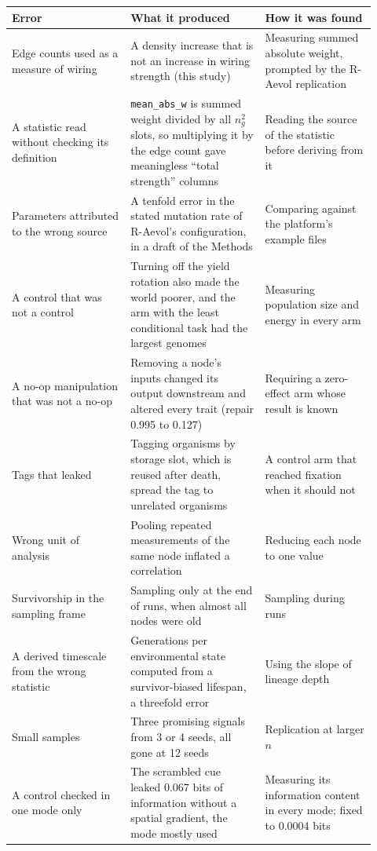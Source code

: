 \begin{longtable}{@{}p{0.3\linewidth}p{0.34\linewidth}p{0.28\linewidth}@{}}
\toprule
Error & What it produced & How it was found\\
\midrule
\endhead
Edge counts used as a measure of wiring & A density increase that is not an
increase in wiring strength (this study) & Measuring summed absolute weight,
prompted by the R-Aevol replication\\
A statistic read without checking its definition & \texttt{mean\_abs\_w} is summed
weight divided by all $n_g^2$ slots, so multiplying it by the edge count gave
meaningless ``total strength'' columns & Reading the source of the statistic
before deriving from it\\
Parameters attributed to the wrong source & A tenfold error in the stated
mutation rate of R-Aevol's configuration, in a draft of the Methods & Comparing
against the platform's example files\\
A control that was not a control & Turning off the yield rotation also made the world poorer, and the arm with the least conditional task had the largest genomes & Measuring population size and energy
in every arm\\
A no-op manipulation that was not a no-op & Removing a node's inputs changed its
output downstream and altered every trait (repair 0.995 to 0.127) & Requiring a
zero-effect arm whose result is known\\
Tags that leaked & Tagging organisms by storage slot, which is reused after
death, spread the tag to unrelated organisms & A control arm that reached
fixation when it should not\\
Wrong unit of analysis & Pooling repeated measurements of the same node inflated
a correlation & Reducing each node to one value\\
Survivorship in the sampling frame & Sampling only at the end of runs, when almost
all nodes were old & Sampling during runs\\
A derived timescale from the wrong statistic & Generations per environmental
state computed from a survivor-biased lifespan, a threefold error & Using the
slope of lineage depth\\
Small samples & Three promising signals from 3 or 4 seeds, all gone at 12 seeds &
Replication at larger $n$\\
A control checked in one mode only & The scrambled cue leaked 0.067 bits of
information without a spatial gradient, the mode mostly used & Measuring its
information content in every mode; fixed to 0.0004 bits\\

\end{longtable}
